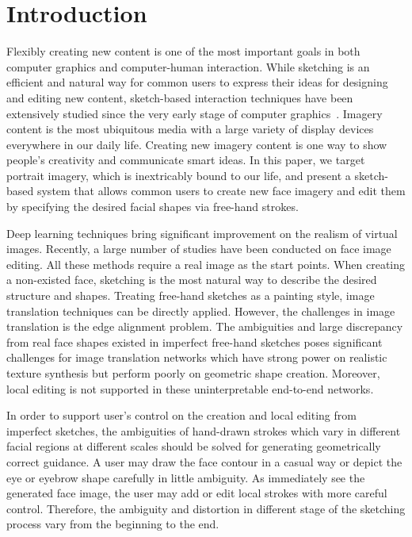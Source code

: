 
\section{Introduction}



Flexibly creating new content is one of the most important goals in both computer graphics and computer-human interaction. While sketching is an efficient and natural way for common users to express their ideas for designing and editing new content, sketch-based interaction techniques have been extensively studied since the very early stage of computer graphics~\cite{SutherlandSketchPad64,Zeleznik-Sketch96,Igarashi-teddy99,Chen_sketchingreality08,Chen09sketch2photo}. 
Imagery content is the most ubiquitous media with a large variety of display devices everywhere in our daily life. 
Creating new imagery content is one way to show people's creativity and communicate smart ideas.
%
In this paper, we target portrait imagery, which is inextricably bound to our life, and present a sketch-based system that allows common users to create new face imagery and edit them by specifying the desired facial shapes via free-hand strokes. 

Deep learning techniques bring significant improvement on the realism of virtual images. 
Recently, a large number of studies have been conducted on face image editing. 
All these methods require a real image as the start points. 
When creating a non-existed face, sketching is the most natural way to describe the desired structure and shapes. 
%
Treating free-hand sketches as a painting style, image translation techniques can be directly applied. 
However, the challenges in image translation is the edge alignment problem. 
The ambiguities and large discrepancy from real face shapes existed in imperfect free-hand sketches poses significant challenges for image translation networks which have strong power on realistic texture synthesis but perform poorly on geometric shape creation. 
Moreover, local editing is not supported in these uninterpretable end-to-end networks. 



In order to support user's control on the creation and local editing from imperfect sketches, the ambiguities of hand-drawn strokes which vary in different facial regions at different scales should be solved for generating geometrically correct guidance. 
 A user may draw the face contour in a casual way or depict the eye or eyebrow shape carefully in little ambiguity. 
 As immediately see the generated face image, the user may add or edit local strokes with more careful control. Therefore, the ambiguity and distortion in different stage of the sketching process vary from the beginning to the end. 


